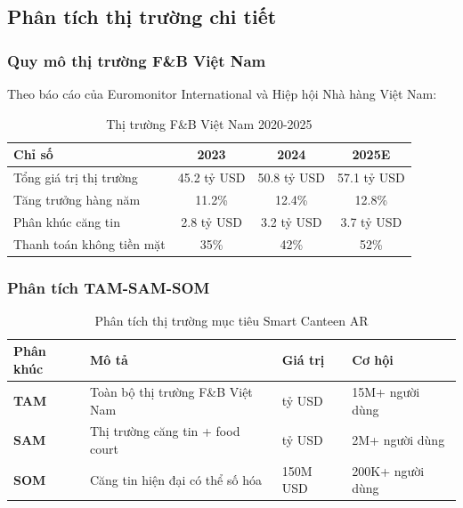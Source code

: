 \documentclass[12pt,a4paper]{article}
\begin{document}
\subsection{Phân tích thị trường chi tiết}

\subsubsection{Quy mô thị trường F\&B Việt Nam}
Theo báo cáo của Euromonitor International và Hiệp hội Nhà hàng Việt Nam:

\begin{table}[H]
\centering
\caption{Thị trường F\&B Việt Nam 2020-2025}
\label{tab:market-size}
\begin{tabular}{@{}lccc@{}}
\toprule
\textbf{Chỉ số} & \textbf{2023} & \textbf{2024} & \textbf{2025E} \\
\midrule
Tổng giá trị thị trường & 45.2 tỷ USD & 50.8 tỷ USD & 57.1 tỷ USD \\
Tăng trưởng hàng năm & 11.2\% & 12.4\% & 12.8\% \\
Phân khúc căng tin & 2.8 tỷ USD & 3.2 tỷ USD & 3.7 tỷ USD \\
Thanh toán không tiền mặt & 35\% & 42\% & 52\% \\
\bottomrule
\end{tabular}
\end{table}

\subsubsection{Phân tích TAM-SAM-SOM}

\begin{table}[H]
\centering
\caption{Phân tích thị trường mục tiêu Smart Canteen AR}
\label{tab:tam-sam-som}
\begin{tabular}{@{}>{\raggedright\arraybackslash}p{3cm}>{\raggedright\arraybackslash}p{4cm}>{\raggedright\arraybackslash}p{3cm}>{\raggedright\arraybackslash}p{4cm}@{}}
\toprule
\textbf{Phân khúc} & \textbf{Mô tả} & \textbf{Giá trị} & \textbf{Cơ hội} \\
\midrule
\textbf{TAM} & Toàn bộ thị trường F\&B Việt Nam & 57.1 tỷ USD & 15M+ người dùng \\
\textbf{SAM} & Thị trường căng tin + food court & 3.7 tỷ USD & 2M+ người dùng \\
\textbf{SOM} & Căng tin hiện đại có thể số hóa & 150M USD & 200K+ người dùng \\
\bottomrule
\end{tabular}
\end{table}
\end{document}
